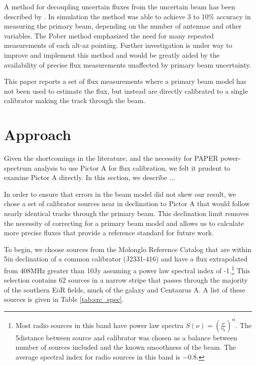 \documentclass[preprint]{aastex}
\begin{document}
A method for decoupling uncertain fluxes from the uncertain beam has been
described by \citet{Pober:2012p8800}. In simulation the method was able to
achieve 3 to 10\% accuracy in measuring the primary beam, depending on the
number of antennae and other variables. The Pober method emphasized the need
for many repeated measurements of each alt-az pointing. Further investigation
is under way to improve and implement this method and would be greatly aided by
the availability of precise flux measurements unaffected by primary beam
uncertainty. 

This paper reports a set of flux measurements where a primary beam
model has not been used to estimate the flux, but instead are directly
calibrated to a single calibrator making the track through the beam.

\section{Approach}

Given the shortcomings in the literature, and the necessity for PAPER power-spectrum analysis
to use Pictor A for flux calibration, we felt it prudent to examine Pictor A directly.
In this section, we describe ... %

In order to ensure that 
errors in
the beam model did not skew our result, we chose a set of calibrator sources near in declination
to Pictor A that would follow nearly identical tracks through the primary beam.
This declination limit removes the necessity of correcting for a primary beam model and allows us to calculate more precise fluxes that provide a reference standard for future work.

To begin, we choose sources from the Molonglo
Reference Catalog \cite[MRC]{Large:1981p7798} that are within 5\arcdeg in
declination of a common calibrator (J2331-416) and have a flux extrapolated
from 408MHz greater than 10Jy assuming a power law spectral index of
-1.\footnote{Most radio sources in this band have power law spectra $S(\nu) =
\left(\frac{\nu}{\nu_0}\right)^\alpha$.  The 5\arcdeg distance between source
and calibrator was chosen as a balance between number of sources included and
the known smoothness of the beam.   The average spectral index for radio
sources in this band is $-0.8$.} This selection contains 62 sources in a narrow
stripe that passes through the majority of the southern EoR fields, much of the
galaxy and Centaurus A.
A list of these 
sources is given in Table \ref{tab:src_spec}. 
\end{document}
